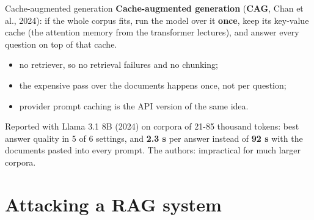 \begin{frame}{Cache-augmented generation}
  \vspace{0.2em}
  \textbf{Cache-augmented generation} (\textbf{CAG}, Chan et al., 2024): if the whole corpus fits,
  run the model over it \textbf{once}, keep its key-value cache (the attention memory from the
  transformer lectures), and answer every question on top of that cache.

  \vspace{0.3em}
  \begin{itemize}
    \item no retriever, so no retrieval failures and no chunking;
    \item the expensive pass over the documents happens once, not per question;
    \item provider prompt caching is the API version of the same idea.
  \end{itemize}

  \vspace{0.3em}
  {\small Reported with Llama 3.1 8B (2024) on corpora of 21-85 thousand tokens: best answer
  quality in 5 of 6 settings, and \textbf{2.3 s} per answer instead of \textbf{92 s} with the
  documents pasted into every prompt. The authors: impractical for much larger corpora.}

  \vspace{0.2em}
\end{frame}

\section{Attacking a RAG system}


